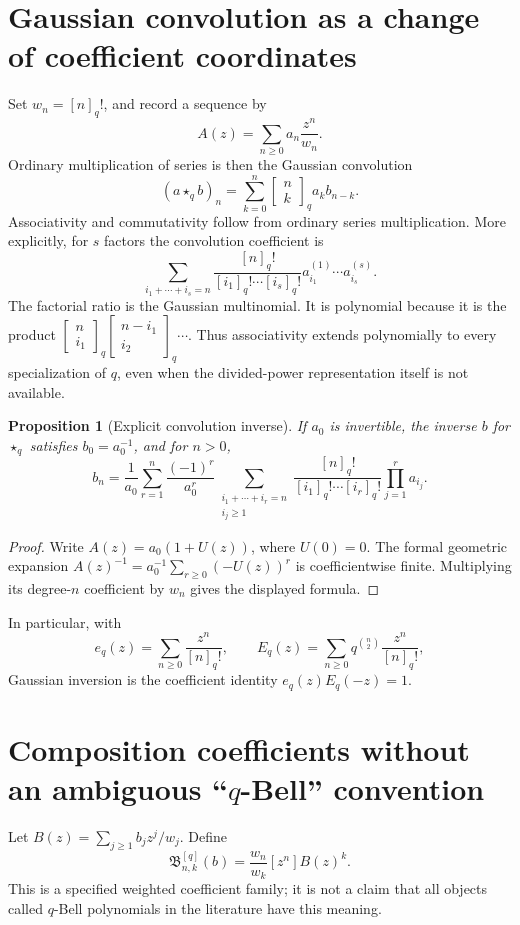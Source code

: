 \documentclass[11pt,a4paper,oneside,openany]{book}
\newtheorem{proposition}[theorem]{Proposition}
\theoremstyle{definition}
\theoremstyle{remark}
\newcommand{\GB}[3][q]{\begin{bmatrix}#2\\#3\end{bmatrix}_{#1}}
\newcommand{\qB}[2]{\mathfrak B^{[q]}_{#1,#2}}
\newcommand{\qbname}{\texorpdfstring{$q$}{q}}
\begin{document}
\section{Gaussian convolution as a change of coefficient coordinates}
Set \(w_n=[n]_q!\), and record a sequence by
\[
 A(z)=\sum_{n\ge0}a_n\frac{z^n}{w_n}.
\]
Ordinary multiplication of series is then the Gaussian convolution
\begin{equation}\label{q1:qcc:q-convolution}
 (a\star_q b)_n=\sum_{k=0}^n\GB nk a_kb_{n-k}.
\end{equation}
Associativity and commutativity follow from ordinary series multiplication.
More explicitly, for \(s\) factors the convolution coefficient is
\begin{equation}\label{q1:qcc:q-multinomial}
 \sum_{i_1+\cdots+i_s=n}
 \frac{[n]_q!}{[i_1]_q!\cdots[i_s]_q!}
 a^{(1)}_{i_1}\cdots a^{(s)}_{i_s}.
\end{equation}
The factorial ratio is the Gaussian multinomial. It is polynomial because it is
the product
\(\GB n{i_1}\GB{n-i_1}{i_2}\cdots\).
Thus associativity extends polynomially to every specialization of \(q\), even
when the divided-power representation itself is not available.

\begin{proposition}[Explicit convolution inverse]\label{q1:qcc:convolution-inverse}
If \(a_0\) is invertible, the inverse \(b\) for \(\star_q\) satisfies
\(b_0=a_0^{-1}\), and for \(n>0\),
\begin{equation}\label{q1:qcc:convolution-inverse-formula}
 b_n=\frac1{a_0}\sum_{r=1}^n\frac{(-1)^r}{a_0^r}
 \sum_{\substack{i_1+\cdots+i_r=n\\i_j\ge1}}
 \frac{[n]_q!}{[i_1]_q!\cdots[i_r]_q!}\prod_{j=1}^r a_{i_j}.
\end{equation}
\end{proposition}
\begin{proof}
Write \(A(z)=a_0(1+U(z))\), where \(U(0)=0\). The formal geometric expansion
\(A(z)^{-1}=a_0^{-1}\sum_{r\ge0}(-U(z))^r\) is coefficientwise finite.
Multiplying its degree-\(n\) coefficient by \(w_n\) gives the displayed formula.
\end{proof}
In particular, with
\[
 e_q(z)=\sum_{n\ge0}\frac{z^n}{[n]_q!},\qquad
 E_q(z)=\sum_{n\ge0}q^{\binom n2}\frac{z^n}{[n]_q!},
\]
Gaussian inversion is the coefficient identity \(e_q(z)E_q(-z)=1\).

\section{Composition coefficients without an ambiguous ``\qbname-Bell'' convention}
Let
\(B(z)=\sum_{j\ge1}b_jz^j/w_j\). Define
\begin{equation}\label{q1:qcc:weighted-bell-def}
 \qB nk(b)=\frac{w_n}{w_k}[z^n]B(z)^k.
\end{equation}
This is a specified weighted coefficient family; it is not a claim that all
objects called \(q\)-Bell polynomials in the literature have this meaning.
\end{document}
